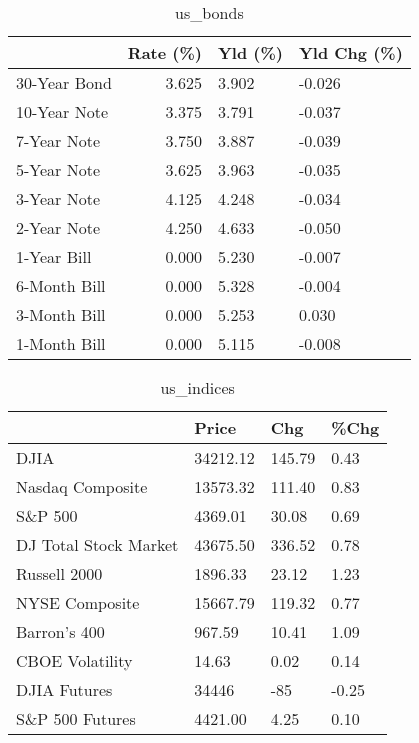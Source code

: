 \documentclass{article}%
\begin{document}
\begin{table}[htbp]%
\caption{us\_bonds}%
\centering%
\begin{adjustbox}{width=1\textwidth}%
\begin{tabular}{lrll}
\toprule
             &  Rate (\%) & Yld (\%) & Yld Chg (\%) \\
\midrule
30-Year Bond &     3.625 &   3.902 &      -0.026 \\
10-Year Note &     3.375 &   3.791 &      -0.037 \\
 7-Year Note &     3.750 &   3.887 &      -0.039 \\
 5-Year Note &     3.625 &   3.963 &      -0.035 \\
 3-Year Note &     4.125 &   4.248 &      -0.034 \\
 2-Year Note &     4.250 &   4.633 &      -0.050 \\
 1-Year Bill &     0.000 &   5.230 &      -0.007 \\
6-Month Bill &     0.000 &   5.328 &      -0.004 \\
3-Month Bill &     0.000 &   5.253 &       0.030 \\
1-Month Bill &     0.000 &   5.115 &      -0.008 \\
\bottomrule
\end{tabular}
%
\end{adjustbox}%
\end{table}

%


\begin{table}[htbp]%
\caption{us\_indices}%
\centering%
\begin{adjustbox}{width=1\textwidth}%
\begin{tabular}{llll}
\toprule
                      &    Price &    Chg &  \%Chg \\
\midrule
                 DJIA & 34212.12 & 145.79 &  0.43 \\
     Nasdaq Composite & 13573.32 & 111.40 &  0.83 \\
              S\&P 500 &  4369.01 &  30.08 &  0.69 \\
DJ Total Stock Market & 43675.50 & 336.52 &  0.78 \\
         Russell 2000 &  1896.33 &  23.12 &  1.23 \\
       NYSE Composite & 15667.79 & 119.32 &  0.77 \\
         Barron's 400 &   967.59 &  10.41 &  1.09 \\
      CBOE Volatility &    14.63 &   0.02 &  0.14 \\
         DJIA Futures &    34446 &    -85 & -0.25 \\
      S\&P 500 Futures &  4421.00 &   4.25 &  0.10 \\
\bottomrule
\end{tabular}
%
\end{adjustbox}%
\end{table}
\end{document}

